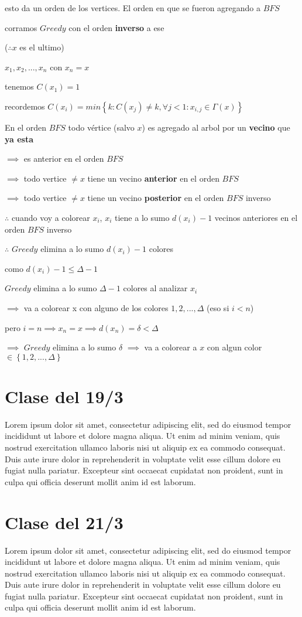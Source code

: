 \documentclass[12pt]{article}
\begin{document}
esto da un orden de los vertices. El orden en que se fueron agregando a $BFS$\bigskip

corramos $Greedy$ con el orden \textbf{inverso} a ese

($\therefore x$ es el ultimo)

$x_1, x_2, ... , x_n$ con $x_n = x$\bigskip

tenemos $C(x_1) = 1$

recordemos $C(x_i) = min\left\{k : C(x_j) \neq k,  \forall j < 1 : x_{i,j} \in \Gamma(x)\right\}$\bigskip

En el orden $BFS$ todo vértice (salvo $x$) es agregado al arbol por un \textbf{vecino} que \textbf{ya esta} 

$\implies$ es anterior en el orden $BFS$

$\implies$ todo vertice $\neq x$ tiene un vecino \textbf{anterior} en el orden $BFS$

$\implies$ todo vertice $\neq x$ tiene un vecino \textbf{posterior} en el orden $BFS$ inverso\bigskip

$\therefore$ cuando voy  a colorear $x_i$, $x_i$ tiene a lo sumo $d(x_i) - 1$ vecinos anteriores en el orden $BFS$ inverso

$\therefore$ $Greedy$ elimina a lo sumo $d(x_i) - 1$ colores\bigskip

como $d(x_i) - 1 \leq \Delta -1$

$Greedy$ elimina a lo sumo $\Delta - 1$ colores al analizar $x_i$

$\implies$ va a colorear x con alguno de los colores $1, 2, ..., \Delta$ (eso si $i < n$)\bigskip

pero $i=n \implies x_n = x \implies d(x_n) = \delta < \Delta$

$\implies$ $Greedy$ elimina a lo sumo $\delta$ $\implies$ va a colorear a $x$ con algun color $\in\left\{1, 2, ..., \Delta\right\}$

\newpage

\section*{Clase del 19/3}
Lorem ipsum dolor sit amet, consectetur adipiscing elit, sed do eiusmod tempor incididunt ut labore et dolore magna aliqua. Ut enim ad minim veniam, quis nostrud exercitation ullamco laboris nisi ut aliquip ex ea commodo consequat. Duis aute irure dolor in reprehenderit in voluptate velit esse cillum dolore eu fugiat nulla pariatur. Excepteur sint occaecat cupidatat non proident, sunt in culpa qui officia deserunt mollit anim id est laborum.
\newpage

\section*{Clase del 21/3}
Lorem ipsum dolor sit amet, consectetur adipiscing elit, sed do eiusmod tempor incididunt ut labore et dolore magna aliqua. Ut enim ad minim veniam, quis nostrud exercitation ullamco laboris nisi ut aliquip ex ea commodo consequat. Duis aute irure dolor in reprehenderit in voluptate velit esse cillum dolore eu fugiat nulla pariatur. Excepteur sint occaecat cupidatat non proident, sunt in culpa qui officia deserunt mollit anim id est laborum.
\end{document}
